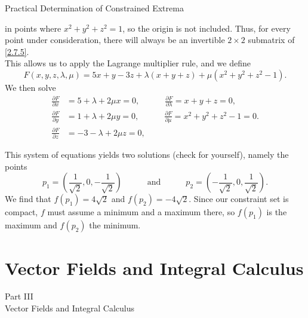 \documentclass[smaller,hyperref={CJKbookmarks=true}]{beamer}
\begin{document}
\begin{frame}{Practical Determination of Constrained Extrema}
\begin{spacing}{0.9}
in points where $x^2+y^2+z^2=1$, so the origin is not included. Thus, for every point under consideration, there will always be an invertible $2\times 2$ submatrix of \eqref{2.7.5}.\\[5pt]
This allows us to apply the Lagrange multiplier rule, and we define
\[F(x,y,z,\lambda,\mu)=5x+y-3z+\lambda(x+y+z)
+\mu(x^2+y^2+z^2-1).\]
We then solve
\begin{align*}
  \frac{\partial F}{\partial x} &=5+\lambda+2\mu x=0,\qquad\quad\frac{\partial F}{\partial\lambda}=x+y+z=0, \\
  \frac{\partial F}{\partial y} &=1+\lambda+2\mu y=0,\qquad\quad\frac{\partial F}{\partial\mu}=x^2+y^2+z^2-1=0. \\
  \frac{\partial F}{\partial z} &=-3-\lambda+2\mu z=0,
\end{align*}
\end{spacing}
\newpage
\begin{spacing}{1.2}
\vspace*{18pt}
This system of equations yields two solutions (check for yourself), namely
the points
\begin{equation*}
  p_1=\left(\frac{1}{\sqrt{2}},0,-\frac{1}{\sqrt{2}}\right)\qquad\quad
  \text{and}\qquad\quad p_2=\left(-\frac{1}{\sqrt{2}},0,\frac{1}{\sqrt{2}}\right).
\end{equation*}
We find that $f(p_1)=4\sqrt{2}$ and $f(p_2)=-4\sqrt{2}$. Since our constraint set is
compact, $f$ must assume a minimum and a maximum there, so $f(p_1)$ is the maximum and $f(p_2)$ the minimum.
\end{spacing}
\end{frame}
\section{Vector Fields and Integral Calculus}
\begin{frame}[c]
\begin{center}
  \huge{Part III}\\ \alert{Vector Fields and Integral Calculus}
\end{center}
\end{frame}
\begin{frame}[c] \begin{spacing}{2.5}
\tableofcontents[hideothersubsections,sectionstyle=hide] \end{spacing}
\end{frame}
\end{document}
